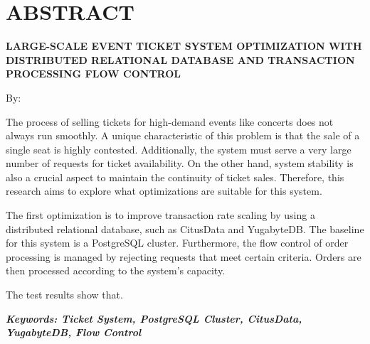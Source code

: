 \clearpage
\chapter*{ABSTRACT}

\begin{center}
  \center
  \begin{singlespace}
    \large\bfseries\MakeUppercase{Large-Scale Event Ticket System Optimization with Distributed Relational Database and Transaction Processing Flow Control}

    \normalfont\normalsize
    By:

    \bfseries \theauthor
  \end{singlespace}
\end{center}


\begin{singlespace}
  \small
  The process of selling tickets for high-demand events like concerts does not always run smoothly. A unique characteristic of this problem is that the sale of a single seat is highly contested. Additionally, the system must serve a very large number of requests for ticket availability. On the other hand, system stability is also a crucial aspect to maintain the continuity of ticket sales. Therefore, this research aims to explore what optimizations are suitable for this system.

  The first optimization is to improve transaction rate scaling by using a distributed relational database, such as CitusData and YugabyteDB. The baseline for this system is a PostgreSQL cluster. Furthermore, the flow control of order processing is managed by rejecting requests that meet certain criteria. Orders are then processed according to the system's capacity.

  The test results show that.

  \textbf{\textit{Keywords: Ticket System, PostgreSQL Cluster, CitusData, YugabyteDB, Flow Control}}
\end{singlespace}
\clearpage

\clearpage